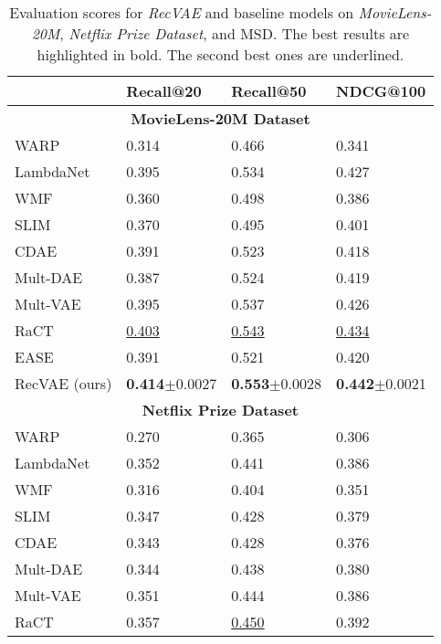 \documentclass[sigconf,authorversion]{acmart}
\begin{document}
\begin{table}[!t]
\caption{Evaluation scores for \emph{RecVAE} and baseline models on \emph{MovieLens-20M}, \emph{Netflix Prize Dataset}, and MSD. The best results are highlighted in bold. The second best ones are underlined.} 
\centering
\begin{tabular}{l|l|l|l}\toprule
          & \bf Recall@20 & \bf Recall@50 & \bf NDCG@100 \\ \midrule
\multicolumn{4}{c}{\bf MovieLens-20M Dataset} \\\midrule
WARP     \cite{weston2011wsabie}       & 0.314 & 0.466 & 0.341 \\
LambdaNet\cite{burges2007learning}     & 0.395 & 0.534 & 0.427 \\
WMF      \cite{hu2008collaborative}    & 0.360 & 0.498 & 0.386 \\
SLIM     \cite{ning2011slim}           & 0.370 & 0.495 & 0.401 \\
CDAE     \cite{wu2016collaborative}    & 0.391 & 0.523 & 0.418 \\
Mult-DAE \cite{liang2018variational}   & 0.387 & 0.524 & 0.419 \\
Mult-VAE \cite{liang2018variational}   & 0.395 & 0.537 & 0.426 \\
RaCT     \cite{lobel2019towards}       & \underline{0.403} & \underline{0.543} & \underline{0.434} \\
EASE     \cite{steck2019embarrassingly}& 0.391 & 0.521 & 0.420 \\
RecVAE (ours)                          & \textbf{0.414}{\small$\pm$0.0027} & \textbf{0.553}{\small$\pm$0.0028} & \textbf{0.442}{\small$\pm$0.0021} \\ \midrule
\multicolumn{4}{c}{\bf Netflix Prize Dataset} \\\midrule
WARP     \cite{weston2011wsabie}       & 0.270 & 0.365 & 0.306 \\
LambdaNet\cite{burges2007learning}     & 0.352 & 0.441 & 0.386 \\
WMF      \cite{hu2008collaborative}    & 0.316 & 0.404 & 0.351 \\
SLIM     \cite{ning2011slim}           & 0.347 & 0.428 & 0.379 \\
CDAE     \cite{wu2016collaborative}    & 0.343 & 0.428 & 0.376 \\
Mult-DAE \cite{liang2018variational}   & 0.344 & 0.438 & 0.380 \\
Mult-VAE \cite{liang2018variational}   & 0.351 & 0.444 & 0.386 \\
RaCT     \cite{lobel2019towards}       & 0.357 & \underline{0.450} & 0.392 \\

\end{tabular}
\end{table}
\end{document}

